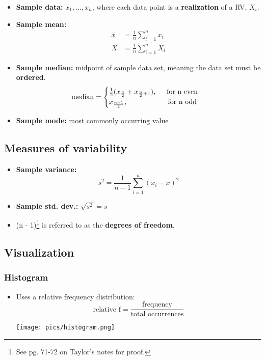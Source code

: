 \documentclass[10pt, letterpaper, twoside]{article}
\newenvironment{Figure}
  {\par\medskip\noindent\minipage{\linewidth}}
  {\endminipage\par\medskip}
\begin{document}
\begin{multicols}{2}
\begin{itemize}
    \item \textbf{Sample data:} {$x_1, ..., x_n$}, where each data point is a \textbf{realization} of a RV, $X_i$.
    \item \textbf{Sample mean:}
    \begin{align*}
        \bar{x} &= \frac{1}{n}\sum_{i=1}^nx_i\\
        \bar{X} &= \frac{1}{n}\sum_{i=1}^nX_i
    \end{align*}
    \item \textbf{Sample median:} midpoint of sample data set, meaning the data set must be \textbf{ordered}.
    \begin{equation*}
        \text{median} = \begin{cases}
            \frac{1}{2}(x_{\frac{n}{2}} + x_{\frac{n}{2}+1}), \hspace{0.5cm} \text{for n even}\\
            x_{\frac{n+1}{2}}, \hspace{2cm} \text{for n odd}
        \end{cases}
    \end{equation*}
    \item \textbf{Sample mode:} most commonly occurring value
\end{itemize}

\subsection{Measures of variability}
\begin{itemize}
    \item \textbf{Sample variance:}
    \begin{equation*}
        s^2 = \frac{1}{n-1}\sum_{i=1}^n(x_i-\bar{x})^2
    \end{equation*}
    \item \textbf{Sample std. dev.:} $\sqrt{s^2} = s$
    \item (n - 1)\footnote[4]{See pg. 71-72 on Taylor's notes for proof.} is referred to as the \textbf{degrees of freedom}.
\end{itemize}

\subsection{Visualization}
\subsubsection*{Histogram}
\begin{itemize}
    \item Uses a relative frequency distribution: 
    \begin{equation*}
        \text{relative f} = \frac{\text{frequency}}{\text{total occurrences}}
    \end{equation*}
    \begin{Figure}
        \centering
        \texttt{[image: pics/histogram.png]}
    \end{Figure}
\end{itemize}

\end{multicols}
\end{document}
